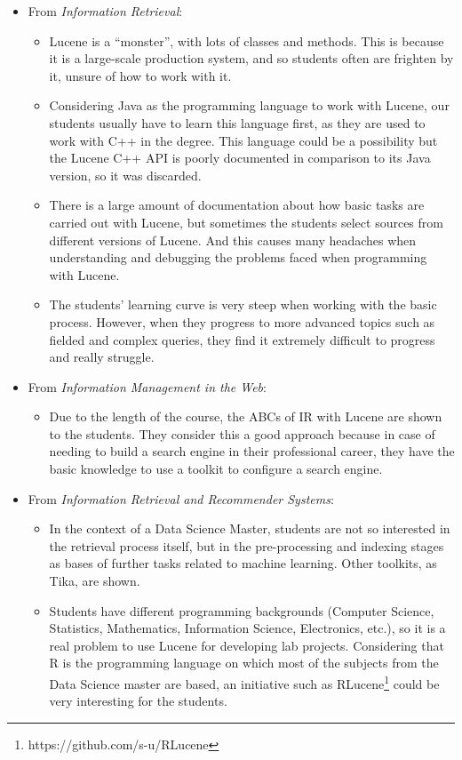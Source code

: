 \begin{itemize}

\item From {\it Information Retrieval}:
	\begin{itemize}
		\item Lucene is a ``monster'', with lots of classes and methods. This is because it is a large-scale production system, and so students often are frighten by it, unsure of how to work with it.
	\item Considering Java as the programming language to work with Lucene, our students usually have to learn this language first, as they are used to work with C++ in the degree. This language could be a possibility but the Lucene C++ API is poorly documented in comparison to its Java version, so it was discarded.
	\item There is a large amount of documentation about how basic tasks are carried out with Lucene, but sometimes the students select sources from different versions of Lucene. And this causes many headaches when understanding and debugging the problems faced when programming with Lucene. 
	\item The students' learning curve is very steep when working with the basic process. However, when they progress to more advanced topics such as fielded and complex queries, they find it extremely difficult to progress and really struggle.
\end{itemize}

\item From {\it Information Management in the Web}:

	\begin{itemize}
		\item Due to the length of the course, the ABCs of IR with Lucene are shown to the students. They consider this a good approach because in case of needing to build a search engine in their professional career, they have the basic knowledge to use a toolkit to configure a search engine.
	\end{itemize}

\item From {\it Information Retrieval and Recommender Systems}:

	\begin{itemize}
		\item In the context of a Data Science Master, students are not so interested in the retrieval process itself, but in the pre-processing and indexing stages as bases of further tasks related to machine learning. Other toolkits, as Tika, are shown.
		\item Students have different programming backgrounds (Computer Science, Statistics, Mathematics, Information Science, Electronics, etc.), so it is a real problem to use Lucene for developing lab projects. Considering that R is the programming language on which most of the subjects from the Data Science master are based, an initiative such as RLucene\footnote{https://github.com/s-u/RLucene} could be very interesting for the students.
	\end{itemize}


\end{itemize}
